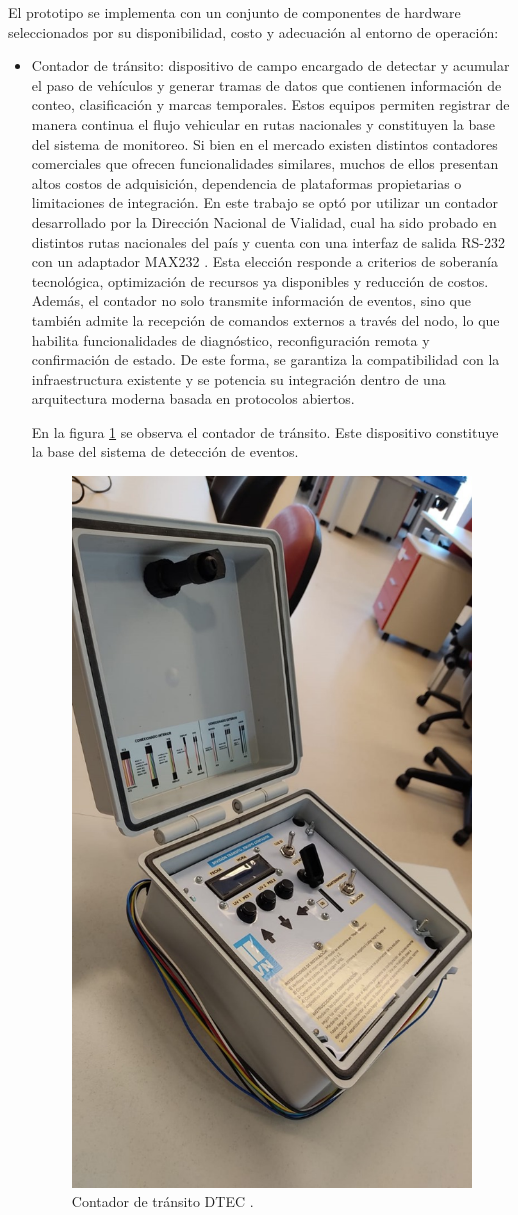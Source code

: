El prototipo se implementa con un conjunto de componentes de hardware seleccionados por su disponibilidad, costo y adecuación al entorno de operación:

\begin{itemize}

\item  Contador de tránsito: dispositivo de campo encargado de detectar y acumular el paso de vehículos y generar tramas de datos que contienen información de conteo, clasificación y marcas temporales. Estos equipos permiten registrar de manera continua el flujo vehicular en rutas nacionales y constituyen la base del sistema de monitoreo. Si bien en el mercado existen distintos contadores comerciales que ofrecen funcionalidades similares, muchos de ellos presentan altos costos de adquisición, dependencia de plataformas propietarias o limitaciones de integración. En este trabajo se optó por utilizar un contador desarrollado por la Dirección Nacional de Vialidad,  cual ha sido probado en distintos rutas nacionales del país y cuenta con una interfaz de salida RS-232 \cite{tiRS232} con un adaptador MAX232 \cite{max232}. Esta elección responde a criterios de soberanía tecnológica, optimización de recursos ya disponibles y reducción de costos. Además, el contador no solo transmite información de eventos, sino que también admite la recepción de comandos externos a través del nodo, lo que habilita funcionalidades de diagnóstico, reconfiguración remota y confirmación de estado. De este forma, se garantiza la compatibilidad con la infraestructura existente y se potencia su integración dentro de una arquitectura moderna basada en protocolos abiertos.

En la figura \ref{fig:foto_dtec1} se observa el contador de tránsito. Este dispositivo constituye la base del sistema de detección de eventos. 

\begin{figure}[H]
  \centering
  \includegraphics[width=0.4\linewidth]{./Figures/fotoDTEC.jpeg}
  \caption{Contador de tránsito DTEC \protect\footnotemark.}
  \label{fig:foto_dtec1}
\end{figure}




\end{itemize}
